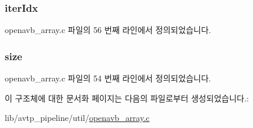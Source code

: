 \subsubsection[{\texorpdfstring{iter\+Idx}{iterIdx}}]{ iter\+Idx}\hypertarget{structopenavb__array_ad1f7c3e14c5a004255c9dfff0891f232}{}\label{structopenavb__array_ad1f7c3e14c5a004255c9dfff0891f232}


openavb\+\_\+array.\+c 파일의 56 번째 라인에서 정의되었습니다.

\subsubsection[{\texorpdfstring{size}{size}}]{ size}\hypertarget{structopenavb__array_a1d835f722a85dc94fbdee4f0a3179038}{}\label{structopenavb__array_a1d835f722a85dc94fbdee4f0a3179038}


openavb\+\_\+array.\+c 파일의 54 번째 라인에서 정의되었습니다.



이 구조체에 대한 문서화 페이지는 다음의 파일로부터 생성되었습니다.\+:\begin{DoxyCompactItemize}
\item 
lib/avtp\+\_\+pipeline/util/\hyperlink{openavb__array_8c}{openavb\+\_\+array.\+c}\end{DoxyCompactItemize}
